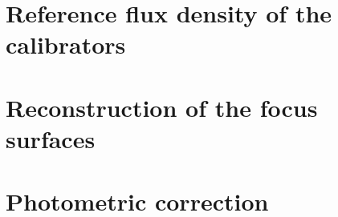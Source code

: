 \documentclass[traditionalabstract]{aa}
\begin{document}
\begin{appendix}
  \section{Reference flux density of the calibrators}
  \label{ap:ref_flux_calibrator}
  
  
  \section{Reconstruction of the focus surfaces}
  \label{ap:focus_surfaces}
  

  \section{Photometric correction}
  \label{ap:photometric_correction_detail}
  
\end{appendix}

%
\end{document}

